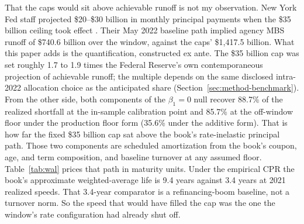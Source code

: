 \documentclass[12pt]{article}
\begin{document}
That the caps would sit above achievable runoff is not my observation. New York Fed staff projected \$20--\$30 billion in monthly principal payments when the \$35 billion ceiling took effect \citep{nyfed2022}. Their May 2022 baseline path implied agency MBS runoff of \$740.6 billion over the window, against the caps' \$1{,}417.5 billion. What this paper adds is the quantification, constructed ex ante. The \$35 billion cap was set roughly 1.7 to 1.9 times the Federal Reserve's own contemporaneous projection of achievable runoff; the multiple depends on the same disclosed intra-2022 allocation choice as the anticipated share (Section~\ref{sec:method-benchmark}). From the other side, both components of the $\beta_1 = 0$ null recover 88.7\% of the realized shortfall at the in-sample calibration point and 85.7\% at the off-window floor under the production floor form (35.6\% under the additive form). That is how far the fixed \$35 billion cap sat above the book's rate-inelastic principal path. Those two components are scheduled amortization from the book's coupon, age, and term composition, and baseline turnover at any assumed floor. Table~\ref{tab:wal} prices that path in maturity units. Under the empirical CPR the book's approximate weighted-average life is 9.4 years against 3.4 years at 2021 realized speeds. That 3.4-year comparator is a refinancing-boom baseline, not a turnover norm. So the speed that would have filled the cap was the one the window's rate configuration had already shut off.
\end{document}

